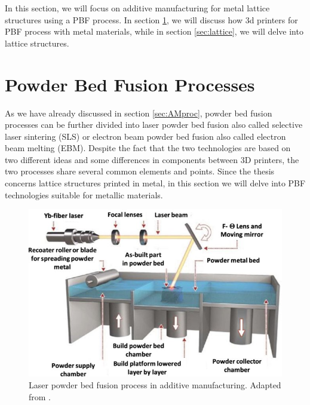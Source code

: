 \setlength{\tabcolsep}{10pt}
In this section, we will focus on additive manufacturing for metal lattice structures using a PBF process. In section \ref{sec:pbf_proc}, we will discuss how 3d printers for PBF process with metal materials, while in section \ref{sec:lattice}, we will delve into lattice structures.
\section{Powder Bed Fusion Processes}\label{sec:pbf_proc}
As we have already discussed in section \ref{sec:AMproc}, powder bed fusion processes can be further divided into laser powder bed fusion also called selective laser sintering (SLS) or electron beam powder bed fusion also called electron beam melting (EBM). Despite the fact that the two technologies are based on two different ideas and some differences in components between 3D printers, the two processes share several common elements and points. Since the thesis concerns lattice structures printed in metal, in this section we will delve into PBF technologies suitable for metallic materials. 
\begin{figure}[H]
    \centering
    \includegraphics[scale=1.3]{Images/PBF.jpg}
    \caption[Laser PBF in AM.]{Laser powder bed fusion process in additive manufacturing. Adapted from \cite{ozel_focus_2020}.}
    \label{fig:PBF}
\end{figure}

